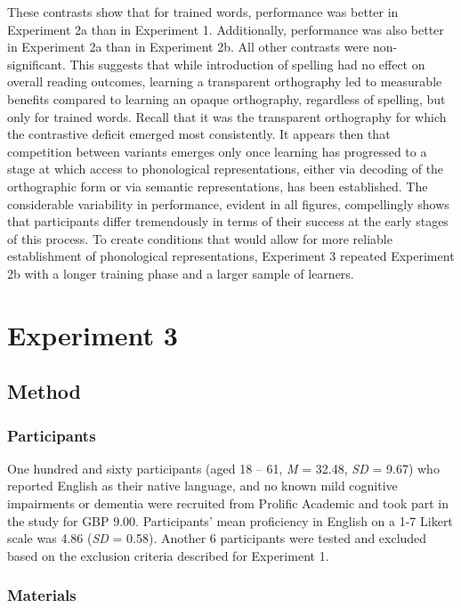 \documentclass[doc,floatsintext]{apa6}
\begin{document}
These contrasts show that for trained words, performance was better in
Experiment 2a than in Experiment 1. Additionally, performance was also
better in Experiment 2a than in Experiment 2b. All other contrasts were
non-significant. This suggests that while introduction of spelling had
no effect on overall reading outcomes, learning a transparent
orthography led to measurable benefits compared to learning an opaque
orthography, regardless of spelling, but only for trained words. Recall
that it was the transparent orthography for which the contrastive
deficit emerged most consistently. It appears then that competition
between variants emerges only once learning has progressed to a stage at
which access to phonological representations, either via decoding of the
orthographic form or via semantic representations, has been established.
The considerable variability in performance, evident in all figures,
compellingly shows that participants differ tremendously in terms of
their success at the early stages of this process. To create conditions
that would allow for more reliable establishment of phonological
representations, Experiment 3 repeated Experiment 2b with a longer
training phase and a larger sample of learners.

\section{Experiment 3}\label{experiment-3}

\subsection{Method}\label{method-3}

\subsubsection{Participants}\label{participants-3}

One hundred and sixty participants (aged 18 -- 61, \emph{M} = 32.48,
\emph{SD} = 9.67) who reported English as their native language, and no
known mild cognitive impairments or dementia were recruited from
Prolific Academic and took part in the study for GBP 9.00. Participants'
mean proficiency in English on a 1-7 Likert scale was 4.86 (\emph{SD} =
0.58). Another 6 participants were tested and excluded based on the
exclusion criteria described for Experiment 1.

\subsubsection{Materials}\label{materials-3}
\end{document}
